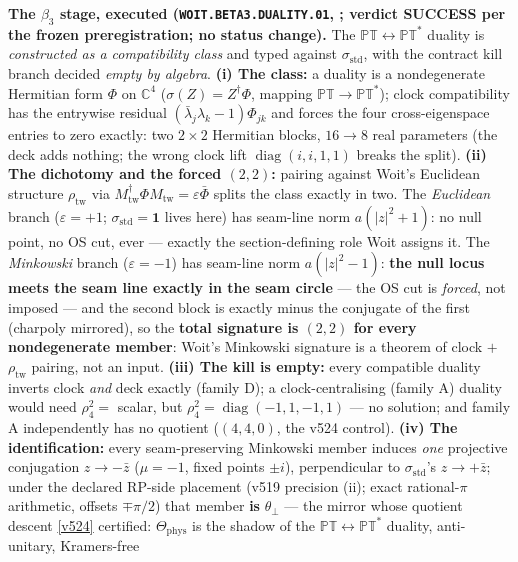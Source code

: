 \par\smallskip\noindent\textbf{The $\beta_3$ stage, executed
(\texttt{WOIT.BETA3.DUALITY.01}, ; verdict SUCCESS per
the frozen preregistration; no status change).}  The $\mathbb{PT}\leftrightarrow\mathbb{PT}^*$
duality is \emph{constructed as a compatibility class} and typed against
$\sigma_{\mathrm{std}}$, with the contract kill branch decided \emph{empty by algebra}.
\textbf{(i) The class:} a duality is a nondegenerate Hermitian form $\Phi$ on $\mathbb{C}^4$
($\sigma(Z)=Z^\dagger\Phi$, mapping $\mathbb{PT}\to\mathbb{PT}^*$); clock compatibility has the
entrywise residual $(\bar\lambda_j\lambda_k-1)\Phi_{jk}$ and forces the four cross-eigenspace
entries to zero exactly: two $2\times2$ Hermitian blocks, $16\to8$ real parameters (the deck
adds nothing; the wrong clock lift $\operatorname{diag}(i,i,1,1)$ breaks the split).
\textbf{(ii) The dichotomy and the forced $(2,2)$:} pairing against Woit's Euclidean structure
$\rho_{\mathrm{tw}}$ via $M_{\mathrm{tw}}^\dagger\Phi M_{\mathrm{tw}}=\varepsilon\bar\Phi$
splits the class exactly in two.  The \emph{Euclidean} branch ($\varepsilon=+1$;
$\sigma_{\mathrm{std}}=\mathbf 1$ lives here) has seam-line norm $a(|z|^2+1)$: no null point,
no OS cut, ever --- exactly the section-defining role Woit assigns it.  The \emph{Minkowski}
branch ($\varepsilon=-1$) has seam-line norm $a(|z|^2-1)$: \textbf{the null locus meets the
seam line exactly in the seam circle} --- the OS cut is \emph{forced}, not imposed --- and the
second block is exactly minus the conjugate of the first (charpoly mirrored), so the
\textbf{total signature is $(2,2)$ for every nondegenerate member}: Woit's Minkowski signature
is a theorem of clock $+$ $\rho_{\mathrm{tw}}$ pairing, not an input.  \textbf{(iii) The kill
is empty:} every compatible duality inverts clock \emph{and} deck exactly (family D); a
clock-centralising (family A) duality would need $\rho_4^2=$ scalar, but
$\rho_4^2=\operatorname{diag}(-1,1,-1,1)$ --- no solution; and family A independently has no
quotient ($(4,4,0)$, the v524 control).  \textbf{(iv) The identification:} every
seam-preserving Minkowski member induces \emph{one} projective conjugation
$z\to-\bar z$ ($\mu=-1$, fixed points $\pm i$), perpendicular to $\sigma_{\mathrm{std}}$'s
$z\to+\bar z$; under the declared RP-side placement (v519 precision (ii); exact
rational-$\pi$ arithmetic, offsets $\mp\pi/2$) that member \textbf{is} $\theta_\perp$ --- the
mirror whose quotient descent \vref{v524} certified: $\Theta_{\mathrm{phys}}$ is the shadow of
the $\mathbb{PT}\leftrightarrow\mathbb{PT}^*$ duality, anti-unitary, Kramers-free
